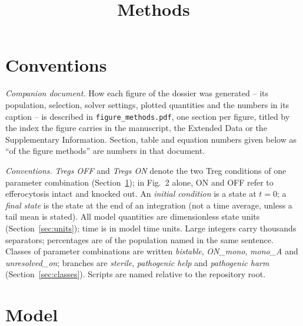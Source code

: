 \documentclass[11pt]{article}
\title{Methods}
\author{}
\date{}
\begin{document}
\maketitle
\tableofcontents

\section*{Conventions}


\emph{Companion document.} How each figure of the dossier was generated -- its
population, selection, solver settings, plotted quantities and the numbers in its
caption -- is described in \texttt{figure\_methods.pdf}, one section per figure,
titled by the index the figure carries in the manuscript, the Extended Data or the
Supplementary Information. Section, table and equation numbers given below as ``of
the figure methods'' are numbers in that document.

\emph{Conventions.} \emph{Tregs OFF} and \emph{Tregs ON} denote the two Treg
conditions of one parameter combination (Section~\ref{sec:model}); in Fig.~2
alone, ON and OFF refer to efferocytosis intact and knocked out. An \emph{initial
condition} is a state at $t = 0$; a \emph{final state} is the state at the end of an
integration (not a time average, unless a tail mean is stated). All
model quantities are dimensionless state units (Section~\ref{sec:units}); time is in model
time units. Large integers carry thousands separators; percentages are of the
population named in the same sentence. Classes of parameter combinations are
written \emph{bistable}, \emph{ON\_mono}, \emph{mono\_A} and
\emph{unresolved\_on}; branches are \emph{sterile}, \emph{pathogenic help} and
\emph{pathogenic harm} (Section~\ref{sec:classes}). Scripts are named relative to
the repository root.
\section{Model}
\label{sec:model}

\end{document}

